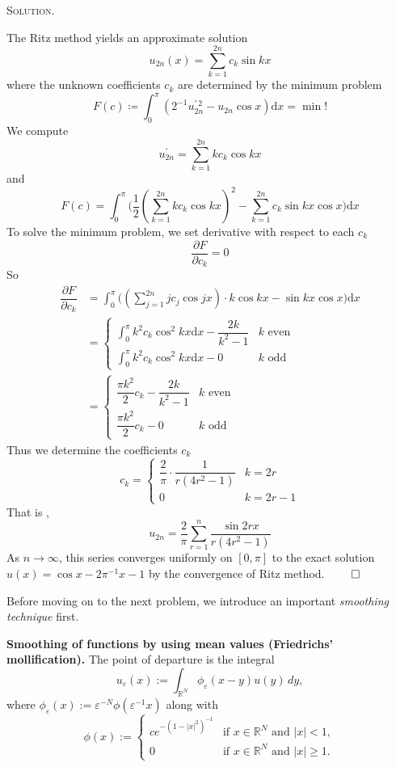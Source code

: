 \documentclass[12pt, a4paper, oneside]{ctexart}
\newenvironment{solution}{%
	\par\noindent\textsc{Solution. }\ignorespaces
}{%
	\hfill$\qed$\par
}
\begin{document}
	\begin{solution}
		The Ritz method yields an approximate solution\[ u_{2n}(x) = \sum_{k=1}^{2n}c_{k}\sin kx \]where the unknown coefficients $c_{k}$ are determined by the minimum problem\[ F(c)\coloneqq\int_{0}^{\pi}(2^{-1}u_{2n}^{\prime\, 2} - u_{2n}\cos x)\mathrm{d}x = \min ! \]
		We compute\[ u_{2n}^{\prime} = \sum_{k=1}^{2n}kc_{k}\cos kx \]and\[ F(c) = \int_{0}^{\pi}\big(\dfrac{1}{2}(\sum_{k=1}^{2n}kc_{k}\cos kx)^{2}- \sum_{k=1}^{2n}c_{k}\sin kx\cos x\big)\mathrm{d}x\]To solve the minimum problem, we set derivative with respect to each $c_{k}$\[ \dfrac{\partial F}{\partial c_{k}} = 0 \] So
		\begin{align*}
			\dfrac{\partial F}{\partial c_{k}}&=\int_{0}^{\pi}\big((\sum_{j=1}^{2n}jc_{j}\cos jx)\cdot k\cos kx-\sin kx\cos x\big)\mathrm{d}x\\&=
			\begin{cases}
				\int_{0}^{\pi}k^{2}c_{k}\cos^{2} kx\mathrm{d}x - \dfrac{2k}{k^{2}-1} & k\text{ even}\\
				\int_{0}^{\pi}k^{2}c_{k}\cos^{2} kx\mathrm{d}x - 0 & k\text{ odd}
			\end{cases}\\
			& = \begin{cases}
				\dfrac{\pi k^{2}}{2} c_{k} - \dfrac{2k}{k^{2}-1} & k\text{ even}\\
				\dfrac{\pi k^{2}}{2} c_{k} - 0 & k\text{ odd}
			\end{cases}
		\end{align*}
		Thus we determine the coefficients $c_{k}$\[ c_{k} = \begin{cases}
			 \dfrac{2}{\pi}\cdot\dfrac{1}{r(4r^{2}-1)} & k = 2r\\
		 0 & k = 2r-1
		\end{cases} \]
		That is ,\[ u_{2n} = \dfrac{2}{\pi}\sum_{r=1}^{n}\dfrac{\sin 2rx}{r(4r^{2}-1)} \]As $n\to\infty$, this series converges uniformly on $[0,\pi]$ to the exact solution $u(x)= \cos x-2\pi^{-1}x-1$ by the convergence of Ritz method.
	\end{solution}
	
	Before moving on to the next problem, we introduce an important \textit{smoothing technique} first.
	
	\noindent \textbf{Smoothing of functions by using mean values (Friedrichs' mollification).} The point of departure is the integral
	\[
	u_\varepsilon(x) := \int_{\mathbb{R}^N} \phi_\varepsilon(x - y) u(y) \, dy,
	\]
	where \( \phi_\varepsilon(x) := \varepsilon^{-N} \phi(\varepsilon^{-1} x) \) along with
	\[
	\phi(x) := 
	\begin{cases} 
		ce^{-(1 - |x|^2)^{-1}} & \text{if } x \in \mathbb{R}^N \text{ and } |x| < 1, \\
		0 & \text{if } x \in \mathbb{R}^N \text{ and } |x| \geq 1.
	\end{cases}
	\]
	
\end{document}
